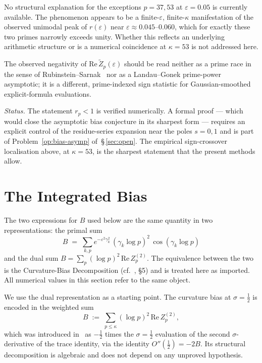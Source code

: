 \documentclass[11pt]{article}
\newcommand{\Zt}{\widetilde{Z}}
\begin{document}
No structural explanation for the exceptions $p=37,53$ at
$\varepsilon=0.05$ is currently available.
The phenomenon appears to be a finite-$\varepsilon$, finite-$\kappa$
manifestation of the observed unimodal peak of $r(\varepsilon)$ near
$\varepsilon\approx 0.045$--$0.060$, which for exactly these two
primes narrowly exceeds unity.
Whether this reflects an underlying arithmetic structure or is a
numerical coincidence at $\kappa=53$ is not addressed here.

The observed negativity of $\mathrm{Re}\,\Zt_p(\varepsilon)$ should
be read neither as a prime race in the sense of
Rubinstein--Sarnak~\cite{RubinsteinSarnak} nor as a Landau--Gonek
prime-power asymptotic; it is a different, prime-indexed sign
statistic for Gaussian-smoothed explicit-formula evaluations.

\emph{Status.}
The statement $r_p<1$ is verified numerically.
A formal proof --- which would close the asymptotic bias conjecture in
its sharpest form --- requires an explicit control of the
residue-series expansion near the poles $s=0,1$ and is part of
Problem~\ref{op:bias-asymp} of~\S\,\ref{sec:open}.
The empirical sign-crossover localisation above, at $\kappa=53$, is
the sharpest statement that the present methods allow.

\section{The Integrated Bias}
\label{sec:intbias}

The two expressions for $B$ used below are the same quantity in two
representations: the primal sum
\[
B \;=\; \sum_{k,p} e^{-\varepsilon^2\gamma_k^2}\,(\gamma_k\log p)^2\,
         \cos(\gamma_k\log p)
\]
and the dual sum $B=\sum_p(\log p)^2\,\mathrm{Re}\,Z_p^{(2)}$.
The equivalence between the two is the Curvature-Bias Decomposition
(cf.~\cite{Paper5}, \S5)
and is treated here as imported.
All numerical values in this section refer to the same object.

We use the dual representation as a starting point.
The curvature bias at $\sigma=\tfrac12$ is encoded in the weighted sum
\[
B \;:=\; \sum_{p\le\kappa}(\log p)^2\,\mathrm{Re}\,Z_p^{(2)},
\]
which was introduced in~\cite{Paper5} as $-\tfrac12$ times the
$\sigma=\tfrac12$ evaluation of the second $\sigma$-derivative of the
trace identity, via the identity $O''(\tfrac12)=-2B$.
Its structural decomposition is algebraic and does not depend on any
unproved hypothesis.
\end{document}
